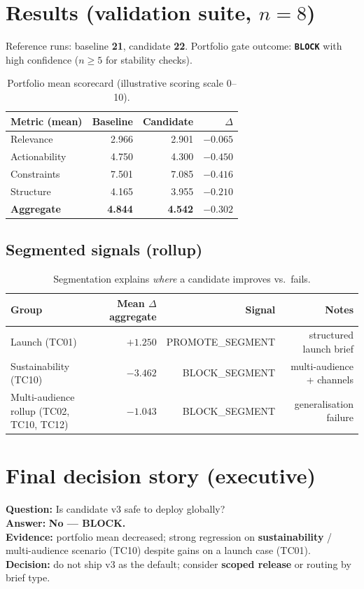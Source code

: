 \documentclass[11pt,a4paper]{article}
\newcommand{\JD}[1]{\colorbox{KwFill}{\textbf{\small #1}}}
\begin{document}
\section{Results (validation suite, $n=8$)}
Reference runs: baseline \textbf{21}, candidate \textbf{22}. Portfolio gate outcome: \textbf{\texttt{BLOCK}} with high confidence ($n\ge 5$ for stability checks).

\begin{table}[htbp]
\centering
\small
\begin{tabular}{@{}lrrr@{}}
\toprule
\textbf{Metric (mean)} & \textbf{Baseline} & \textbf{Candidate} & \textbf{$\Delta$} \\
\midrule
Relevance & 2.966 & 2.901 & $-0.065$ \\
Actionability & 4.750 & 4.300 & $-0.450$ \\
Constraints & 7.501 & 7.085 & $-0.416$ \\
Structure & 4.165 & 3.955 & $-0.210$ \\
\textbf{Aggregate} & \textbf{4.844} & \textbf{4.542} & \textbf{$-0.302$} \\
\bottomrule
\end{tabular}
\caption{Portfolio mean scorecard (illustrative scoring scale 0--10).}
\end{table}

\subsection{Segmented signals (rollup)}
\begin{table}[htbp]
\centering
\small
\begin{tabular}{@{}lrrr@{}}
\toprule
\textbf{Group} & \textbf{Mean $\Delta$ aggregate} & \textbf{Signal} & \textbf{Notes} \\
\midrule
Launch (TC01) & $+1.250$ & PROMOTE\_SEGMENT & structured launch brief \\
Sustainability (TC10) & $-3.462$ & BLOCK\_SEGMENT & multi-audience + channels \\
Multi-audience rollup (TC02, TC10, TC12) & $-1.043$ & BLOCK\_SEGMENT & generalisation failure \\
\bottomrule
\end{tabular}
\caption{Segmentation explains \emph{where} a candidate improves vs.\ fails.}
\end{table}

\section{Final decision story (executive)}
\textbf{Question:} Is candidate v3 safe to deploy globally?\\
\textbf{Answer:} \textbf{No --- BLOCK.}\\
\textbf{Evidence:} portfolio mean decreased; strong regression on \JD{sustainability} / multi-audience scenario (TC10) despite gains on a launch case (TC01).\\
\textbf{Decision:} do not ship v3 as the default; consider \JD{scoped release} or routing by brief type.
\end{document}
